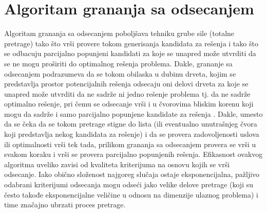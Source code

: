 \documentclass[12pt,oneside]{memoir}
\begin{document}
\section{Algoritam grananja sa odsecanjem}
\label{sec:algGrananjaSaOdsecanjem}
Algoritam grananja sa odsecanjem poboljšava tehniku grube sile (totalne pretrage) tako što vrši provere tokom generisanja
kandidata za rešenja i tako što se odbacuju parcijalno popunjeni kandidati za koje se unapred može utvrditi
da se ne mogu proširiti do optimalnog rešenja problema. Dakle, grananje sa odsecanjem podrazumeva da se tokom
obilaska u dubinu drveta, kojim se predstavlja prostor potencijalnih rešenja odsecaju oni delovi drveta za koje se unapred
može utvrditi da ne sadrže ni jedno rešenje problema tj. da ne sadrže optimalno rešenje, pri čemu se odsecanje vrši
i u čvorovima bliskim korenu koji mogu da sadrže i samo parcijalno popunjene kandidate za rešenja \cite{PetljaBackTracking}.
Dakle, umesto da se čeka da se tokom pretrage stigne do lista (ili eventualno unutrašnjeg čvora koji predstavlja
nekog kandidata za rešenje) i da se provera zadovoljenosti uslova ili optimalnosti vrši tek tada, prilikom grananja sa
odsecanjem provera se vrši u svakom koraku i vrši se provera parcijalno popunjenih rešenja.
Efikasnost ovakvog algoritma uveliko zavisi od kvaliteta kriterijuma na osnovu kojih se vrši odsecanje. Iako obično
složenost najgoreg slučaja ostaje eksponencijalna, pažljivo odabrani
kriterijumi odsecanja mogu odseći jako velike delove pretrage (koji su često takođe eksponencijalne veličine u odnosu
na dimenzije ulaznog problema) i time značajno ubrzati proces pretrage.
\end{document}
